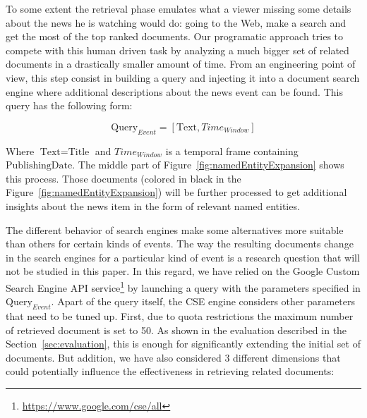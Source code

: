 \documentclass{llncs}
\begin{document}
To some extent the retrieval phase emulates what a viewer missing some details about the news he is watching would do: going to the Web, make a search and get the most of the top ranked documents. Our programatic approach tries to compete with this human driven task by analyzing a much bigger set of related documents in a drastically smaller amount of time. From an engineering point of view, this step consist in building a query and injecting it into a document search engine where additional descriptions about the news event can be found. This query has the following form:
 
\begin{equation}
\text{Query}_{Event} =\left [ \text{Text}, Time_{Window} \right ]
\end{equation}

Where $\text{Text}=\text{Title}$ and $Time_{Window}$ is a temporal frame containing $\text{PublishingDate}$. The middle part of Figure~\ref{fig:namedEntityExpansion} shows this process. Those documents (colored in black in the Figure~\ref{fig:namedEntityExpansion}) will be further processed to get additional insights about the news item in the form of relevant named entities.

The different behavior of search engines make some alternatives more suitable than others for certain kinds of events. The way the resulting documents change in the search engines for a particular kind of event is a research question that will not be studied in this paper. In this regard, we have relied on the Google Custom Search Engine API service\footnote{\fontsize{8pt}{1em}\selectfont  \url{https://www.google.com/cse/all}} by launching a query with the parameters specified in $\text{Query}_{Event}$. Apart of the query itself, the CSE engine considers other parameters that need to be tuned up. First, due to quota restrictions the maximum number of retrieved document is set to 50. As shown in the evaluation described in the Section~\ref{sec:evaluation}, this is enough for significantly extending the initial set of documents. But addition, we have also considered 3 different dimensions that could potentially influence the effectiveness in retrieving related documents:
\end{document}

